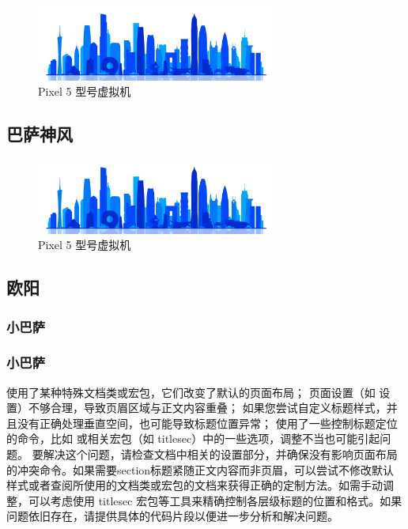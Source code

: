 \documentclass[a4paper]{ctexart}
\begin{document}
\begin{figure}[ht]
  \centering
  \includegraphics[width=0.7\textwidth]{./Img/Guangdong101.jpg}
  \caption{Pixel 5 型号虚拟机}\label{fig:a_0}
\end{figure}


\subsection{巴萨神风}

\begin{figure}[ht]
  \centering
  \includegraphics[width=0.7\textwidth]{./Img/Guangdong101.jpg}
  \caption{Pixel 5 型号虚拟机}\label{fig:a_1}
\end{figure}

\subsection{欧阳}

\subsubsection{小巴萨}


\subsubsection{小巴萨}


使用了某种特殊文档类或宏包，它们改变了默认的页面布局；
页面设置（如  设置）不够合理，导致页眉区域与正文内容重叠；
如果您尝试自定义标题样式，并且没有正确处理垂直空间，也可能导致标题位置异常；
使用了一些控制标题定位的命令，比如  或相关宏包（如 titlesec）中的一些选项，调整不当也可能引起问题。
要解决这个问题，请检查文档中相关的设置部分，并确保没有影响页面布局的冲突命令。如果需要section标题紧随正文内容而非页眉，可以尝试不修改默认样式或者查阅所使用的文档类或宏包的文档来获得正确的定制方法。如需手动调整，可以考虑使用 titlesec 宏包等工具来精确控制各层级标题的位置和格式。如果问题依旧存在，请提供具体的代码片段以便进一步分析和解决问题。
\end{document}

